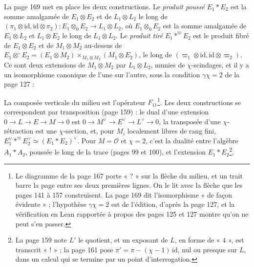 \documentclass[11pt,a4paper]{article}
\begin{document}
La page 169 met en place les deux constructions. Le \emph{produit poussé}
$E_1 * E_2$ est la somme amalgamée de $E_1 \otimes E_2$ et de $L_1 \otimes L_2$ le long de
$(\pi_1 \otimes \mathrm{id}, \mathrm{id} \otimes \pi_2) : E_1 \otimes_0 E_2 \to L_1 \otimes L_2$, où
$E_1 \otimes_0 E_2$ est la somme amalgamée de $E_1 \otimes L_2$ et $L_1 \otimes E_2$ le long de
$L_1 \otimes L_2$. Le \emph{produit tiré} $E_1 *^{\varpi} E_2$ est le produit fibré de
$E_1 \otimes E_2$ et de $M_1 \otimes M_2$ au-dessus de $E_1 \otimes^{\circ} E_2 = (E_1 \otimes M_2)
\times_{M_1 \otimes M_2} (M_1 \otimes E_2)$, le long de $(\varpi_1 \otimes \mathrm{id}, \mathrm{id} \otimes
\varpi_2)$. Ce sont deux extensions de $M_1 \otimes M_2$ par $L_1 \otimes L_2$, munies de
$\chi$-scindages, et il y a un isomorphisme canonique de l'une sur l'autre, sous la
condition $\gamma\chi = 2$ de la page 127 :


La composée verticale du milieu est l'opérateur $F_{11}$\footnote{Le diagramme de la
page 167 porte « ? » sur la flèche du milieu, et un trait barre la page entre ses
deux premières lignes. On le lit avec la flèche que les pages 141 à 157
construisent. La page 169 dit l'isomorphisme « de façon évidente » ; l'hypothèse
$\gamma\chi = 2$ est de l'édition, d'après la page 127, et la vérification en
Lean rapportée à propos des pages 125 et 127 montre qu'on ne peut s'en passer.}. Les deux constructions se
correspondent par transposition (page 159) : le dual d'une extension
$0 \to L \to E \to M \to 0$ est $0 \to M^{\vee} \to E^{\vee} \to L^{\vee} \to 0$, la
transposée d'une $\chi$-rétraction est une $\chi$-section, et, pour $M_i$ localement
libres de rang fini, $E_1^{\vee} *^{\varpi} E_2^{\vee} \simeq (E_1 * E_2)^{\vee}$. Pour
$M = \mathcal{O}$ et $\chi = 2$, c'est la dualité entre l'algèbre $A_1 * A_2$, poussée
le long de la trace (pages 99 et 100), et l'extension $E_1 * E_2$\footnote{La page 159
note $L'$ le quotient, et un exposant de $L$, en forme de « $4$ », est transcrit
« ! » ; la page 161 pose $\pi' = \pi - (\chi - 1)\,\mathrm{id}$, nul ou presque sur
$L$, dans un calcul qui se termine par un point d'interrogation.}.
\end{document}
